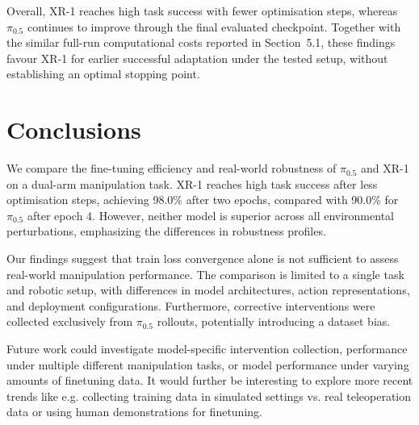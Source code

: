 \documentclass[10pt,twocolumn,letterpaper]{article}
\begin{document}
Overall, XR-1 reaches high task success with fewer optimisation steps, whereas $\pi_{0.5}$ continues to improve through the final evaluated checkpoint. Together with the similar full-run computational costs reported in Section~5.1, these findings favour XR-1 for earlier successful adaptation under the tested setup, without establishing an optimal stopping point.

\section{Conclusions}
We compare the fine-tuning efficiency and real-world robustness of $\pi_{0.5}$ and XR-1 on a dual-arm manipulation task. XR-1 reaches high task success after less optimisation steps, achieving 98.0\% after two epochs, compared with 90.0\% for $\pi_{0.5}$ after epoch 4. However, neither model is superior across all environmental perturbations, emphasizing the differences in robustness profiles.

Our findings suggest that train loss convergence alone is not sufficient to assess real-world manipulation performance. The comparison is limited to a single task and robotic setup, with differences in model architectures, action representations, and deployment configurations. Furthermore, corrective interventions were collected exclusively from $\pi_{0.5}$ rollouts, potentially introducing a dataset bias.

Future work could investigate model-specific intervention collection, performance under multiple different manipulation tasks, or model performance under varying amounts of finetuning data. It would further be interesting to explore more recent trends like e.g. collecting training data in simulated settings vs. real teleoperation data or using human demonstrations for finetuning. 

{\small


}
\end{document}
